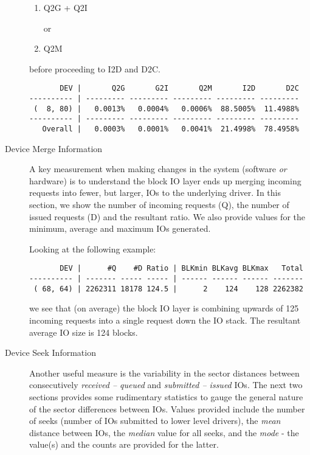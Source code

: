 \documentclass{article}
\begin{document}
\begin{description}
{\begin{enumerate}
  \item Q2G + Q2I

  or

  \item Q2M
\end{enumerate}
  before proceeding to I2D and D2C.}

\begin{verbatim}
       DEV |       Q2G       G2I       Q2M       I2D       D2C
---------- | --------- --------- --------- --------- ---------
 (  8, 80) |   0.0013%   0.0004%   0.0006%  88.5005%  11.4988%
---------- | --------- --------- --------- --------- ---------
   Overall |   0.0003%   0.0001%   0.0041%  21.4998%  78.4958%
\end{verbatim}

  \item[Device Merge Information]

  A key measurement when making changes in the system (software \emph{or}
  hardware) is to understand the block IO layer ends up merging incoming
  requests into fewer, but larger, IOs to the underlying driver. In this
  section, we show the number of incoming requests (Q), the number of
  issued requests (D) and the resultant ratio. We also provide values
  for the minimum, average and maximum IOs generated.

  Looking at the following example:

\begin{verbatim}
       DEV |      #Q    #D Ratio | BLKmin BLKavg BLKmax   Total
---------- | ------- ----- ----- | ------ ------ ------ -------
 ( 68, 64) | 2262311 18178 124.5 |      2    124    128 2262382
\end{verbatim}

  we see that (on average) the block IO layer is combining upwards of
  125 incoming requests into a single request down the IO stack. The
  resultant average IO size is 124 blocks.

  \item[Device Seek Information]

  Another useful measure is the variability in the sector distances
  between consecutively \emph{received -- queued} and \emph{submitted
  -- issued} IOs. The next two sections provides some rudimentary
  statistics to gauge the general nature of the sector differences
  between IOs. Values provided include the number of seeks (number of IOs
  submitted to lower level drivers), the \emph{mean} distance between
  IOs, the \emph{median} value for all seeks, and the \emph{mode} -
  the value(s) and the counts are provided for the latter.


\end{description}
\end{document}
